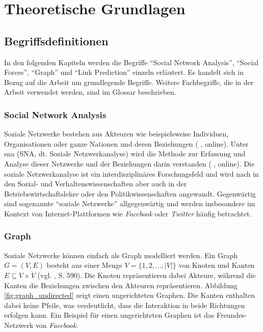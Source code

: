 \chapter{Theoretische Grundlagen}

\section{Begriffsdefinitionen}
In den folgenden Kapiteln werden die Begriffe ``Social Network Analysis'', ``Social Forces'', ``Graph'' und ``Link Prediction'' einzeln
erläutert. Es handelt sich in Bezug auf die Arbeit um grundlegende Begriffe. Weitere Fachbegriffe, die
in der Arbeit verwendet werden, sind im Glossar beschrieben.

\subsection{Social Network Analysis}
Soziale Netzwerke bestehen aus Akteuren wie beispielsweise Individuen, Organisationen oder ganze Nationen und deren Beziehungen (\citeauthor{ulrike_baumol_soziale_2019} \citeyear{ulrike_baumol_soziale_2019}, online).
Unter \acl{sna} (SNA, dt. Soziale Netzwerkanalyse) wird die Methode zur Erfassung und Analyse dieser Netzwerke und der Beziehungen darin verstanden (\citeauthor{wikipedia_soziale_2019} \citeyear{wikipedia_soziale_2019}, online).
Die soziale Netzwerkanalyse ist ein interdisziplinäres Forschungsfeld und wird nach \cite{ulrike_baumol_soziale_2019} in den Sozial- und Verhaltenswissenschaften aber auch in der Betriebswirtschaftslehre oder den Politikwissenschaften angewandt.
Gegenwärtig sind sogenannte ``soziale Netzwerke'' allgegenwärtig und werden insbesondere im Kontext von Internet-Plattformen wie \textit{Facebook} oder \textit{Twitter} häufig betrachtet.

\subsection{Graph}
Soziale Netzwerke können einfach als Graph modelliert werden.
Ein Graph $G = (V, E)$ besteht aus einer Menge $V = \{1,2,...,|V|\}$ von Knoten und Kanten $E \subseteq V\times V $ (vgl. \citeauthor{ottmann_algorithmen_2017} \citeyear{ottmann_algorithmen_2017}, S. 590).
Die Knoten repräsentieren dabei Akteure, während die Kanten die Beziehungen zwischen den Akteuren repräsentieren.
Abbildung \ref{fig:graph_undirected} zeigt einen ungerichteten Graphen. Die Kanten enthalten dabei keine Pfeile, was verdeutlicht, dass die Interaktion in beide Richtungen erfolgen kann.
Ein Beispiel für einen ungerichteten Graphen ist das Freundes-Netzwerk von \textit{Facebook}.

